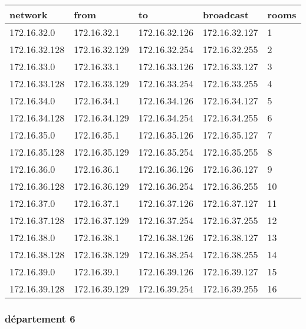 \documentclass[11pt]{article}
\begin{document}
\begin{center}
\begin{tabular}{|l|l|l|l|l|}
\hline
network & from & to & broadcast & rooms \\
\hline
172.16.32.0 & 172.16.32.1 & 172.16.32.126 & 172.16.32.127 & 1 \\
\hline
172.16.32.128 & 172.16.32.129 & 172.16.32.254 & 172.16.32.255 & 2 \\
\hline
172.16.33.0 & 172.16.33.1 & 172.16.33.126 & 172.16.33.127 & 3 \\
\hline
172.16.33.128 & 172.16.33.129 & 172.16.33.254 & 172.16.33.255 & 4 \\
\hline
172.16.34.0 & 172.16.34.1 & 172.16.34.126 & 172.16.34.127 & 5 \\
\hline
172.16.34.128 & 172.16.34.129 & 172.16.34.254 & 172.16.34.255 & 6 \\
\hline
172.16.35.0 & 172.16.35.1 & 172.16.35.126 & 172.16.35.127 & 7 \\
\hline
172.16.35.128 & 172.16.35.129 & 172.16.35.254 & 172.16.35.255 & 8 \\
\hline
172.16.36.0 & 172.16.36.1 & 172.16.36.126 & 172.16.36.127 & 9 \\
\hline
172.16.36.128 & 172.16.36.129 & 172.16.36.254 & 172.16.36.255 & 10 \\
\hline
172.16.37.0 & 172.16.37.1 & 172.16.37.126 & 172.16.37.127 & 11 \\
\hline
172.16.37.128 & 172.16.37.129 & 172.16.37.254 & 172.16.37.255 & 12 \\
\hline
172.16.38.0 & 172.16.38.1 & 172.16.38.126 & 172.16.38.127 & 13 \\
\hline
172.16.38.128 & 172.16.38.129 & 172.16.38.254 & 172.16.38.255 & 14 \\
\hline
172.16.39.0 & 172.16.39.1 & 172.16.39.126 & 172.16.39.127 & 15 \\
\hline
172.16.39.128 & 172.16.39.129 & 172.16.39.254 & 172.16.39.255 & 16 \\
\hline
\end{tabular}
\end{center}

\subsubsection{département 6}
\label{sec:orgheadline10}
\end{document}
